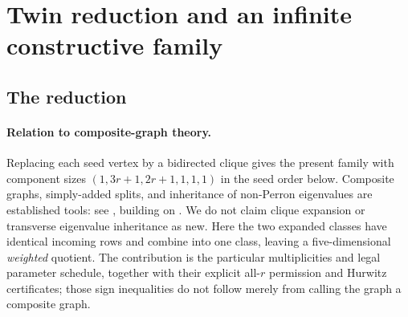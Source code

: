\documentclass[11pt,a4paper]{article}
\theoremstyle{definition}\newtheorem{definition}[theorem]{Definition}
\theoremstyle{remark}\newtheorem{remark}[theorem]{Remark}
\begin{document}
\section{Twin reduction and an infinite constructive family}\label{sec:family}
\subsection{The reduction}
\paragraph{Relation to composite-graph theory.}
Replacing each seed vertex by a bidirected clique gives the present family with component sizes $(1,3r+1,2r+1,1,1,1)$ in the seed order below. Composite graphs, simply-added splits, and inheritance of non-Perron eigenvalues are established tools: see \cite[Section 2.2, Lemma 2.6, and Section 5]{CGM2024}, building on \cite{CGM2019}. We do not claim clique expansion or transverse eigenvalue inheritance as new. Here the two expanded classes have identical incoming rows and combine into one class, leaving a five-dimensional \emph{weighted} quotient. The contribution is the particular multiplicities and legal parameter schedule, together with their explicit all-$r$ permission and Hurwitz certificates; those sign inequalities do not follow merely from calling the graph a composite graph.
\end{document}
